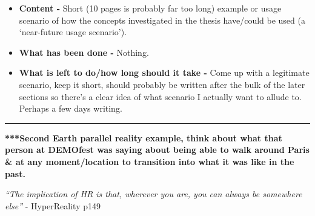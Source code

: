 \begin{itemize}
	\item \textbf{Content -} Short (10 pages is probably far too long) example or usage scenario of how the concepts investigated in the thesis have/could be used (a `near-future usage scenario').
	\item \textbf{What has been done -} Nothing.
	\item \textbf{What is left to do/how long should it take -} Come up with a legitimate scenario, keep it short, should probably be written after the bulk of the later sections so there's a clear idea of what scenario I actually want to allude to. Perhaps a few days writing.
\end{itemize}

\hrule

\vspace{10mm}

\textbf{***Second Earth parallel reality example, think about what that person at DEMOfest was saying about being able to walk around Paris \& at any moment/location to transition into what it was like in the past.}

\textit{``The implication of HR is that, wherever you are, you can always be somewhere else''} - HyperReality p149